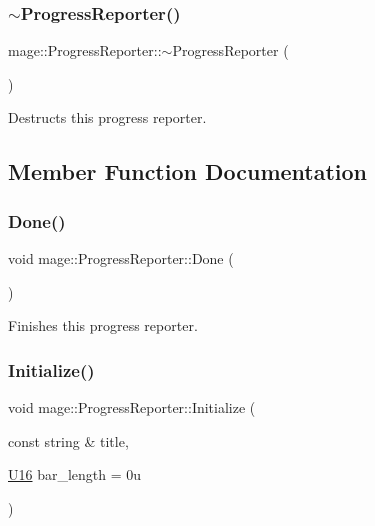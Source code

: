 \subsubsection{\texorpdfstring{$\sim$\+Progress\+Reporter()}{~ProgressReporter()}}
{\footnotesize\ttfamily mage\+::\+Progress\+Reporter\+::$\sim$\+Progress\+Reporter (\begin{DoxyParamCaption}{ }\end{DoxyParamCaption})\hspace{0.3cm}{\ttfamily [default]}}

Destructs this progress reporter. 

\subsection{Member Function Documentation}
\hypertarget{classmage_1_1_progress_reporter_a11d758647ac2082bc296ab53a7454eaa}{}\label{classmage_1_1_progress_reporter_a11d758647ac2082bc296ab53a7454eaa} 
\subsubsection{\texorpdfstring{Done()}{Done()}}
{\footnotesize\ttfamily void mage\+::\+Progress\+Reporter\+::\+Done (\begin{DoxyParamCaption}{ }\end{DoxyParamCaption})}

Finishes this progress reporter. \hypertarget{classmage_1_1_progress_reporter_a2a243bc9271a1f709674b5a99068e06d}{}\label{classmage_1_1_progress_reporter_a2a243bc9271a1f709674b5a99068e06d} 
\subsubsection{\texorpdfstring{Initialize()}{Initialize()}}
{\footnotesize\ttfamily void mage\+::\+Progress\+Reporter\+::\+Initialize (\begin{DoxyParamCaption}\item[{const string \&}]{title,  }\item[{\hyperlink{namespacemage_af69057eec1ce005c1c3b34ae33486f16}{U16}}]{bar\+\_\+length = {\ttfamily 0u} }\end{DoxyParamCaption})\hspace{0.3cm}{\ttfamily [private]}}

